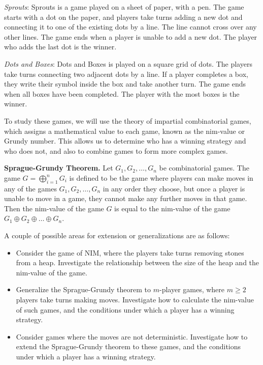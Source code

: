 \documentclass{article}
\begin{document}
\vspace{3mm}
\textit{Sprouts}: Sprouts is a game played on a sheet of paper, with a pen. The game starts with a dot on the paper, and players take turns adding a new dot and connecting it to one of the existing dots by a line. The line cannot cross over any other lines. The game ends when a player is unable to add a new dot. The player who adds the last dot is the winner.

\vspace{3mm}
\textit{Dots and Boxes}: Dots and Boxes is played on a square grid of dots. The players take turns connecting two adjacent dots by a line. If a player completes a box, they write their symbol inside the box and take another turn. The game ends when all boxes have been completed. The player with the most boxes is the winner.

\vspace{3mm}
To study these games, we will use the theory of impartial combinatorial games, which assigns a mathematical value to each game, known as the nim-value or Grundy number. This allows us to determine who has a winning strategy and who does not, and also to combine games to form more complex games.

\vspace{3mm}
\textbf{Sprague-Grundy Theorem.}
Let $G_1, G_2, \dots, G_n$ be combinatorial games. The game $G = \bigoplus_{i=1}^n G_i$ is defined to be the game where players can make moves in any of the games $G_1, G_2, \dots, G_n$ in any order they choose, but once a player is unable to move in a game, they cannot make any further moves in that game. Then the nim-value of the game $G$ is equal to the nim-value of the game $G_1 \oplus G_2 \oplus \dots \oplus G_n$.

\vspace{3mm}
A couple of possible areas for extension or generalizations are as follows:
\begin{itemize}
\item Consider the game of NIM, where the players take turns removing stones from a heap. Investigate the relationship between the size of the heap and the nim-value of the game.
\item Generalize the Sprague-Grundy theorem to $m$-player games, where $m \ge 2$ players take turns making moves. Investigate how to calculate the nim-value of such games, and the conditions under which a player has a winning strategy.
\item Consider games where the moves are not deterministic. Investigate how to extend the Sprague-Grundy theorem to these games, and the conditions under which a player has a winning strategy.
\end{itemize}
\end{document}
